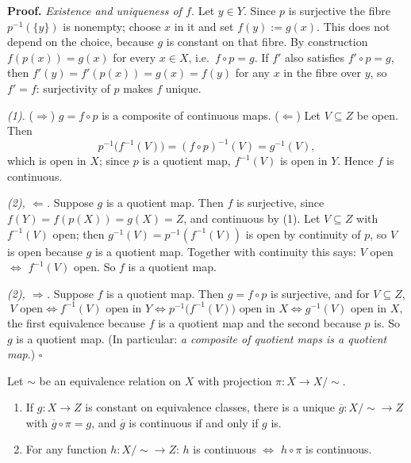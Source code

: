 \documentclass[11pt]{report}
\makeatletter
\newcounter{thmcounter}[section]
\renewenvironment{proof}[1][Proof]{\noindent\textbf{#1.} }{\hfill$\square$\par\vspace{5pt}}
\newcommand{\thmlabel}[1]{\edef\@currentlabel{\arabic{section}.\arabic{thmcounter}}\label{#1}}
\newcommand{\leeref}[1]{\par\smallskip{\raggedleft\footnotesize\textsc{Lee}:\ #1\par}}
\makeatother
\begin{document}
\begin{proof}
\emph{Existence and uniqueness of $f$.} Let $y \in Y$. Since $p$ is surjective the fibre $p^{-1}(\{y\})$ is nonempty; choose $x$ in it and set $f(y) := g(x)$. This does not depend on the choice, because $g$ is constant on that fibre. By construction $f(p(x)) = g(x)$ for every $x \in X$, i.e.\ $f \circ p = g$. If $f'$ also satisfies $f' \circ p = g$, then $f'(y) = f'(p(x)) = g(x) = f(y)$ for any $x$ in the fibre over $y$, so $f' = f$: surjectivity of $p$ makes $f$ unique.

\emph{(1).} ($\Rightarrow$) $g = f \circ p$ is a composite of continuous maps. ($\Leftarrow$) Let $V \subseteq Z$ be open. Then
\[
p^{-1}\big(f^{-1}(V)\big) = (f \circ p)^{-1}(V) = g^{-1}(V),
\]
which is open in $X$; since $p$ is a quotient map, $f^{-1}(V)$ is open in $Y$. Hence $f$ is continuous.

\emph{(2), $\Leftarrow$.} Suppose $g$ is a quotient map. Then $f$ is surjective, since $f(Y) = f(p(X)) = g(X) = Z$, and continuous by (1). Let $V \subseteq Z$ with $f^{-1}(V)$ open; then $g^{-1}(V) = p^{-1}(f^{-1}(V))$ is open by continuity of $p$, so $V$ is open because $g$ is a quotient map. Together with continuity this says: $V$ open $\iff$ $f^{-1}(V)$ open. So $f$ is a quotient map.

\emph{(2), $\Rightarrow$.} Suppose $f$ is a quotient map. Then $g = f \circ p$ is surjective, and for $V \subseteq Z$,
\[
V \text{ open} \iff f^{-1}(V) \text{ open in } Y \iff p^{-1}\big(f^{-1}(V)\big) \text{ open in } X \iff g^{-1}(V) \text{ open in } X,
\]
the first equivalence because $f$ is a quotient map and the second because $p$ is. So $g$ is a quotient map. (In particular: \emph{a composite of quotient maps is a quotient map}.)
\end{proof}

\begin{corbox}\thmlabel{prop:univ-quotient}
Let $\sim$ be an equivalence relation on $X$ with projection $\pi : X \to X/{\sim}$.
\begin{enumerate}
    \item If $g : X \to Z$ is constant on equivalence classes, there is a unique $\overline{g} : X/{\sim} \to Z$ with $\overline{g} \circ \pi = g$, and $\overline{g}$ is continuous if and only if $g$ is.
    \item For any function $h : X/{\sim} \to Z$: $h$ is continuous $\iff$ $h \circ \pi$ is continuous.
\end{enumerate}
\leeref{Theorem A.30}
\end{corbox}
\end{document}
